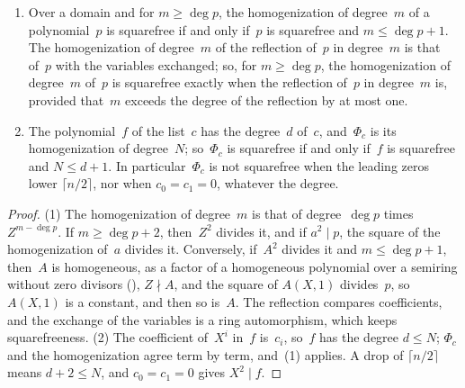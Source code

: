 \begin{lemma}\label{lem:squarefree_binaryFormPoly}
  \leanok
  \begin{enumerate}
    \item Over a domain and for $m \ge \deg p$, the homogenization of degree~$m$ of a
      polynomial~$p$ is squarefree if and only if~$p$ is squarefree and $m \le \deg p + 1$. The
      homogenization of degree~$m$ of the reflection of~$p$ in degree~$m$ is that of~$p$ with the
      variables exchanged; so, for $m \ge \deg p$, the homogenization of degree~$m$ of~$p$ is
      squarefree exactly when the reflection of~$p$ in degree~$m$ is, provided that~$m$ exceeds
      the degree of the reflection by at most one.
    \item The polynomial~$f$ of the list~$c$ has the degree~$d$ of~$c$, and~$\Phi_c$ is its
      homogenization of degree~$N$; so~$\Phi_c$ is squarefree if and only if~$f$ is squarefree and
      $N \le d + 1$. In particular~$\Phi_c$ is not squarefree when the leading zeros lower
      $\lceil n/2 \rceil$, nor when $c_0 = c_1 = 0$, whatever the degree.
  \end{enumerate}
\end{lemma}

\begin{proof}
  \leanok
  (1) The homogenization of degree~$m$ is that of degree~$\deg p$ times $Z^{m - \deg p}$. If
  $m \ge \deg p + 2$, then~$Z^2$ divides it, and if $a^2 \mid p$, the square of the homogenization
  of~$a$ divides it. Conversely, if~$A^2$ divides it and $m \le \deg p + 1$, then~$A$ is
  homogeneous, as a factor of a homogeneous polynomial over a semiring without zero divisors
  (), $Z \nmid A$, and the square of $A(X, 1)$
  divides~$p$, so $A(X, 1)$ is a constant, and then so is~$A$. The reflection compares
  coefficients, and the exchange of the variables is a ring automorphism, which keeps
  squarefreeness. (2) The coefficient of~$X^i$ in~$f$ is~$c_i$, so~$f$ has the degree $d \le N$;
  $\Phi_c$ and the homogenization agree term by term, and~(1) applies. A drop of
  $\lceil n/2 \rceil$ means $d + 2 \le N$, and $c_0 = c_1 = 0$ gives $X^2 \mid f$.
\end{proof}

